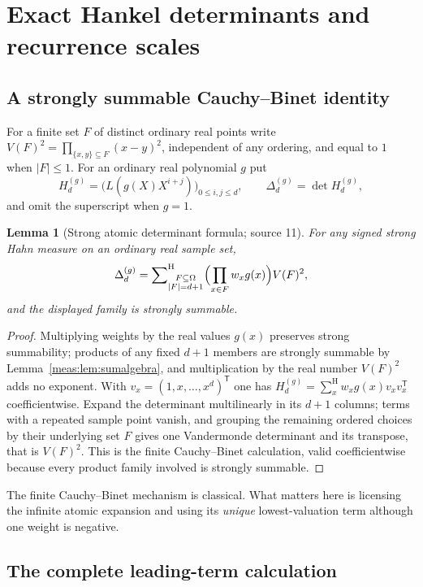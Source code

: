 \documentclass[11pt]{article}
\numberwithin{equation}{section}
\newtheorem{lemma}[theorem]{Lemma}
\theoremstyle{definition}
\theoremstyle{remark}
\newcommand{\hsum}{\mathop{\sum}\nolimits^{\mathrm H}}
\newcommand{\abs}[1]{\lvert#1\rvert}
\begin{document}
\section{Exact Hankel determinants and recurrence scales}
\label{meas:sec:determinants}

\subsection{A strongly summable Cauchy--Binet identity}

For a finite set $F$ of distinct ordinary real points write
$V(F)^2=\prod_{\{x,y\}\subseteq F}(x-y)^2$, independent of any ordering, and
equal to $1$ when $\abs F\le1$. For an ordinary real polynomial $g$ put
\[
 H_d^{(g)}=\bigl(L(g(X)X^{i+j})\bigr)_{0\le i,j\le d},\qquad
 \Delta_d^{(g)}=\det H_d^{(g)},
\]
and omit the superscript when $g=1$.

\begin{lemma}[Strong atomic determinant formula; source 11]\label{meas:lem:CB}
For any signed strong Hahn measure on an ordinary real sample set,
\begin{equation}\label{meas:eq:CB}
 \Delta_d^{(g)}=\hsum_{\substack{F\subseteq\Omega\\\abs F=d+1}}
 \Bigl(\prod_{x\in F}w_xg(x)\Bigr)V(F)^2,
\end{equation}
and the displayed family is strongly summable.
\end{lemma}
\begin{proof}
Multiplying weights by the real values $g(x)$ preserves strong summability;
products of any fixed $d+1$ members are strongly summable by
Lemma~\ref{meas:lem:sumalgebra}, and multiplication by the real number $V(F)^2$
adds no exponent. With $v_x=(1,x,\ldots,x^d)^{\mathsf T}$ one has
$H_d^{(g)}=\hsum_xw_xg(x)v_xv_x^{\mathsf T}$ coefficientwise. Expand the determinant
multilinearly in its $d+1$ columns; terms with a repeated sample point vanish,
and grouping the remaining ordered choices by their underlying set $F$ gives
one Vandermonde determinant and its transpose, that is $V(F)^2$. This is the
finite Cauchy--Binet calculation, valid coefficientwise because every product
family involved is strongly summable.
\end{proof}

The finite Cauchy--Binet mechanism is classical. What matters here is
licensing the infinite atomic expansion and using its \emph{unique}
lowest-valuation term although one weight is negative.

\subsection{The complete leading-term calculation}
\end{document}
